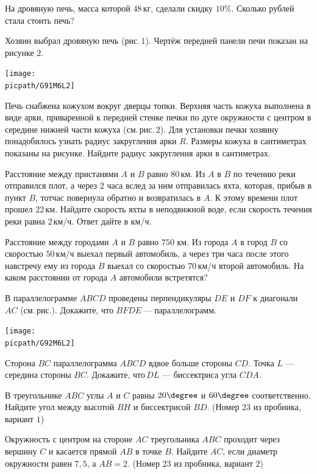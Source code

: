 \begin{class}[number=2]
\begin{listofex}
		\item На дровяную печь, масса которой \( 48 \) кг, сделали скидку \( 10\% \). Сколько рублей стала стоить печь?
		\item Хозяин выбрал дровяную печь (рис. \( 1 \)). Чертёж передней панели печи показан на рисунке \( 2 \).
		\begin{center}
			\texttt{[image: \\picpath/G91M6L2]}
		\end{center}
		Печь снабжена кожухом вокруг дверцы топки. Верхняя часть кожуха выполнена в виде арки, приваренной к передней стенке печки по дуге окружности с центром в середине нижней части кожуха (см. рис. \( 2 \)). Для установки печки хозяину понадобилось узнать радиус закругления арки \( R \). Размеры кожуха в сантиметрах показаны на рисунке. Найдите радиус закругления арки в сантиметрах.
		\item Расстояние между пристанями \( A \) и \( B \) равно \( 80 \) км. Из \( A \) в \( B \) по течению реки отправился плот, а через \( 2 \) часа вслед за ним отправилась яхта, которая, прибыв в пункт \( B \), тотчас повернула обратно и возвратилась в \( A \). К этому времени плот прошел \( 22 \) км. Найдите скорость яхты в неподвижной воде, если скорость течения реки равна \( 2 \) км/ч. Ответ дайте в км/ч.
		\item Расстояние между городами \( A \) и \( B \) равно \( 750  \) км. Из города \( A \) в город \( B \) со скоростью \( 50 \) км/ч выехал первый автомобиль, а через три часа после этого навстречу ему из города \( B \) выехал со скоростью \( 70 \) км/ч второй автомобиль. На каком расстоянии от города \( A \) автомобили встретятся?	
		\item 
		\begin{minipage}[t]{\bodywidth}
			В параллелограмме \( ABCD \) проведены перпендикуляры \( DE \) и \( DF \) к диагонали \( AC \) (см. рис.). Докажите, что \( BFDE \) --- параллелограмм.
		\end{minipage}
		\hspace{0.02\linewidth}
		\begin{minipage}[t]{\picwidth}
			\texttt{[image: \\picpath/G92M6L2]}
		\end{minipage}
		\item Сторона \( BC \) параллелограмма \( ABCD \) вдвое больше стороны \( CD \). Точка \( L \) --- середина стороны \( BC \). Докажите, что \( DL \) --- биссектриса угла \( CDA \).
		\item В треугольнике \( ABC \) углы \( A \) и \( C \) равны \( 20\degree \) и \( 60\degree \) соответственно. Найдите угол между высотой \( BH \) и биссектрисой \( BD \). (Номер \( 23 \) из пробника, вариант \( 1 \))
		\item Окружность с центром на стороне \( AC \) треугольника \( ABC \) проходит через вершину \( C \) и касается прямой \( AB \) в точке \( B \). Найдите \( AC \), если диаметр окружности равен \( 7,5 \), а \( AB=2 \). (Номер \( 23 \) из пробника, вариант \( 2 \))
	\end{listofex}
\end{class}

